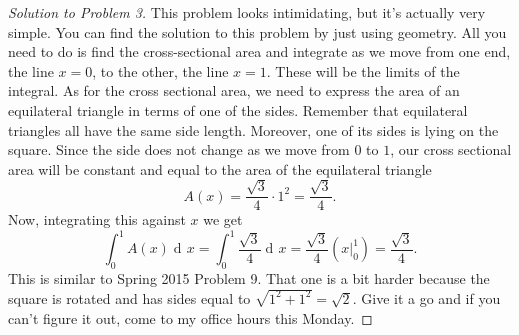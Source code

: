 \documentclass[12pt]{article}
\theoremstyle{plain}
\theoremstyle{definition}
\theoremstyle{remark}
\DeclareMathOperator{\diff}{d\!}
\begin{document}
\begin{proof}[Solution to Problem 3]
This problem looks intimidating, but it's actually very simple. You can
find the solution to this problem by just using geometry. All you need to
do is find the cross-sectional area and integrate as we move from one end,
the line $x=0$, to the other, the line $x=1$. These will be the limits of
the integral. As for the cross sectional area, we need to express the area
of an equilateral triangle in terms of one of the sides. Remember that
equilateral triangles all have the same side length. Moreover, one of its
sides is lying on the square. Since the side does not change as we move
from $0$ to $1$, our cross sectional area will be constant and equal to the
area of the equilateral triangle
\[
A(x)=\frac{\sqrt{3}}{4}\cdot 1^2=\frac{\sqrt{3}}{4}.
\]
Now, integrating this against $x$ we get
\[
\int_0^1 A(x)\diff x=\int_0^1\frac{\sqrt{3}}{4}\diff
x=\frac{\sqrt{3}}{4}\left(\left.x\right|_0^1\right)=\boxed{\frac{\sqrt{3}}{4}.}
\]
This is similar to Spring 2015 Problem 9. That one is a bit harder because
the square is rotated and has sides equal to
$\sqrt{1^2+1^2}=\sqrt{2}$. Give it a go and if you can't figure it out,
come to my office hours this Monday.
\end{proof}
\end{document}
